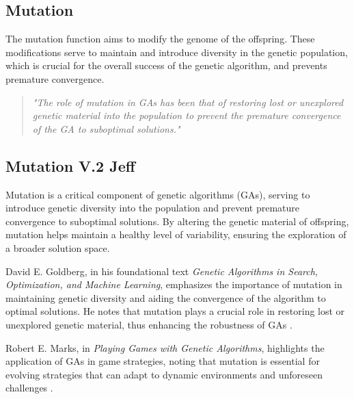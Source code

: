 \documentclass[a4paper, twocolumn]{article}
\begin{document}
\subsection{Mutation\label{sec:Mutation}}

The mutation function aims to modify the genome of the offspring. These modifications serve to maintain and introduce diversity in the genetic population, which is crucial for the overall success of the genetic algorithm, and prevents premature convergence.
\begin{quote}
\emph{
    "The role of mutation in GAs has been that of restoring lost or unexplored genetic material into the population to prevent the premature convergence of the GA to suboptimal solutions."
    }
    \cite{srinvas1994adaptive}
\end{quote}

\subsection{Mutation V.2 Jeff\label{sec:Mutation}}

Mutation is a critical component of genetic algorithms (GAs), serving to introduce genetic diversity into the population and prevent premature convergence to suboptimal solutions. By altering the genetic material of offspring, mutation helps maintain a healthy level of variability, ensuring the exploration of a broader solution space.

David E. Goldberg, in his foundational text \textit{Genetic Algorithms in Search, Optimization, and Machine Learning}, emphasizes the importance of mutation in maintaining genetic diversity and aiding the convergence of the algorithm to optimal solutions. He notes that mutation plays a crucial role in restoring lost or unexplored genetic material, thus enhancing the robustness of GAs \cite{goldberg1989genetic}.

Robert E. Marks, in \textit{Playing Games with Genetic Algorithms}, highlights the application of GAs in game strategies, noting that mutation is essential for evolving strategies that can adapt to dynamic environments and unforeseen challenges \cite{marks2001playing}.
\end{document}
